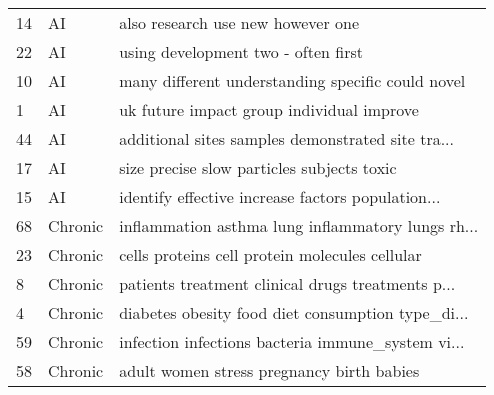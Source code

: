 \begin{tabular}{lll}
14                                                 &                                                 AI &                  also research use new however one \\
22                                                 &                                                 AI &                using development two - often first \\
10                                                 &                                                 AI &  many different understanding specific could novel \\
1                                                  &                                                 AI &          uk future impact group individual improve \\
44                                                 &                                                 AI &  additional sites samples demonstrated site tra... \\
17                                                 &                                                 AI &         size precise slow particles subjects toxic \\
15                                                 &                                                 AI &  identify effective increase factors population... \\
68                                                 &                                            Chronic &  inflammation asthma lung inflammatory lungs rh... \\
23                                                 &                                            Chronic &     cells proteins cell protein molecules cellular \\
8                                                  &                                            Chronic &  patients treatment clinical drugs treatments p... \\
4                                                  &                                            Chronic &  diabetes obesity food diet consumption type\_di... \\
59                                                 &                                            Chronic &  infection infections bacteria immune\_system vi... \\
58                                                 &                                            Chronic &          adult women stress pregnancy birth babies \\

\end{tabular}
